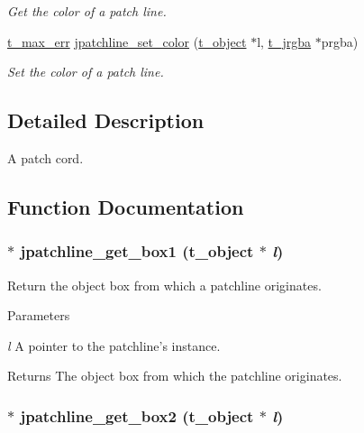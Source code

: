 \begin{DoxyCompactItemize}
\begin{DoxyCompactList}\small\item\em Get the color of a patch line. \item\end{DoxyCompactList}\item 
\hyperlink{group__datatypes_ga73edaae82b318855cc09fac994918165}{t\_\-max\_\-err} \hyperlink{group__jpatchline_ga711fb3e7a43bbfbd6922f3ac60ba7d86}{jpatchline\_\-set\_\-color} (\hyperlink{structt__object}{t\_\-object} $\ast$l, \hyperlink{structt__jrgba}{t\_\-jrgba} $\ast$prgba)
\begin{DoxyCompactList}\small\item\em Set the color of a patch line. \item\end{DoxyCompactList}\end{DoxyCompactItemize}


\subsection{Detailed Description}
A patch cord. 

\subsection{Function Documentation}
\hypertarget{group__jpatchline_ga64a77181748a3f07c149942ef60053c9}{
\subsubsection[{jpatchline\_\-get\_\-box1}]{$\ast$ jpatchline\_\-get\_\-box1 ({\bf t\_\-object} $\ast$ {\em l})}}
\label{group__jpatchline_ga64a77181748a3f07c149942ef60053c9}


Return the object box from which a patchline originates. 
\begin{DoxyParams}{Parameters}
\item[{\em l}]A pointer to the patchline's instance. \end{DoxyParams}
\begin{DoxyReturn}{Returns}
The object box from which the patchline originates. 
\end{DoxyReturn}
\hypertarget{group__jpatchline_ga8785673e61f9b9406e4c77df1b7781b1}{
\subsubsection[{jpatchline\_\-get\_\-box2}]{$\ast$ jpatchline\_\-get\_\-box2 ({\bf t\_\-object} $\ast$ {\em l})}}
\label{group__jpatchline_ga8785673e61f9b9406e4c77df1b7781b1}


